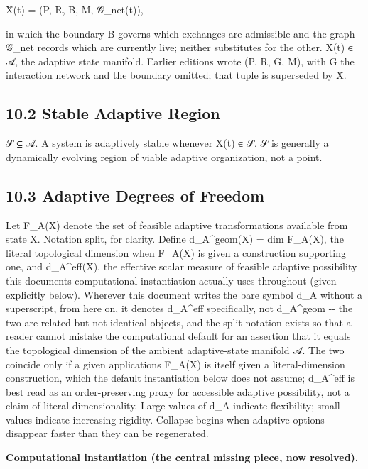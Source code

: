 \documentclass[
]{article}
\begin{document}
X̄(t) = (P, R, B, M, 𝒢\_net(t)),

in which the boundary B governs which exchanges are admissible and the
graph 𝒢\_net records which are currently live; neither substitutes for
the other. X̄(t) ∈ 𝒜, the adaptive state manifold. Earlier editions
wrote (P, R, G, M), with G the interaction network and the boundary
omitted; that tuple is superseded by X̄.

\hypertarget{stable-adaptive-region}{%
\subsection{10.2 Stable Adaptive Region}\label{stable-adaptive-region}}

𝒮 ⊆ 𝒜. A system is adaptively stable whenever X(t) ∈ 𝒮. 𝒮 is generally a
dynamically evolving region of viable adaptive organization, not a
point.

\hypertarget{adaptive-degrees-of-freedom}{%
\subsection{10.3 Adaptive Degrees of
Freedom}\label{adaptive-degrees-of-freedom}}

Let F\_A(X) denote the set of feasible adaptive transformations
available from state X. Notation split, for clarity. Define
d\_A\^{}geom(X) = dim F\_A(X), the literal topological dimension when
F\_A(X) is given a construction supporting one, and d\_A\^{}eff(X), the
effective scalar measure of feasible adaptive possibility this
document\textquotesingle s computational instantiation actually uses
throughout (given explicitly below). Wherever this document writes the
bare symbol d\_A without a superscript, from here on, it denotes
d\_A\^{}eff specifically, not d\_A\^{}geom -\/- the two are related but
not identical objects, and the split notation exists so that a reader
cannot mistake the computational default for an assertion that it equals
the topological dimension of the ambient adaptive-state manifold 𝒜. The
two coincide only if a given application\textquotesingle s F\_A(X) is
itself given a literal-dimension construction, which the default
instantiation below does not assume; d\_A\^{}eff is best read as an
order-preserving proxy for accessible adaptive possibility, not a claim
of literal dimensionality. Large values of d\_A indicate flexibility;
small values indicate increasing rigidity. Collapse begins when adaptive
options disappear faster than they can be regenerated.

\textbf{Computational instantiation (the central missing piece, now
resolved).}
\end{document}
